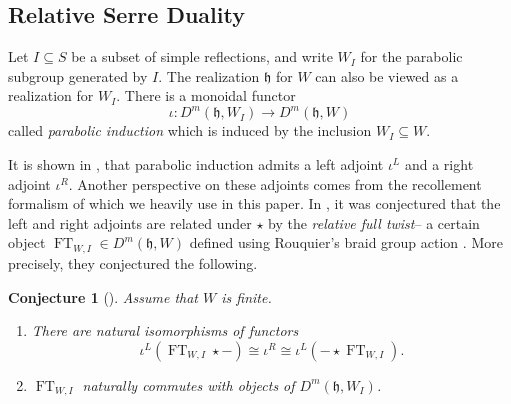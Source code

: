 \documentclass{amsart}
\newcommand{\BE}{D^m}
\newcommand{\fr}[1]{\mathfrak{#1}}
\newtheorem{conjecture}{Conjecture}[section]
\theoremstyle{definition}
\DeclareMathOperator{\FT}{FT}
\begin{document}
        \subsection{Relative Serre Duality}
        Let $I \subseteq S$ be a subset of simple reflections, and write $W_I$ for the parabolic subgroup generated by $I$. The realization $\fr{h}$ for $W$ can also be viewed as a realization for $W_I$. 
        There is a monoidal functor
        \[\iota : \BE (\fr{h}, W_I) \to \BE (\fr{h}, W)\]
        called \emph{parabolic induction} which is induced by the inclusion $W_I \subseteq W$. 

        It is shown in \cite[Corollary A.8]{GHMN}, that parabolic induction admits a left adjoint $\iota^L$ and a right adjoint $\iota^R$.
        Another perspective on these adjoints comes from the recollement formalism of \cite{ARV} which we heavily use in this paper.
        In \cite{GHMN}, it was conjectured that the left and right adjoints are related under $\star$ by the \emph{relative full twist}-- a certain object $\FT_{W, I} \in \BE (\fr{h}, W)$ defined using Rouquier's braid group action \cite{Rou}.
        More precisely, they conjectured the following.

        \begin{conjecture}[{\!\!\cite[Conjecture 1.8]{GHMN}}]\label{conj:rel_serre_duality_intro}
                Assume that $W$ is finite.
                \begin{enumerate}
                        \item There are natural isomorphisms of functors 
                \[
                        \iota^L (\FT_{W, I} \star -) \cong  \iota^R \cong \iota^L (- \star \FT_{W, I}).
                \]
                        \item $\FT_{W,I}$ naturally commutes with objects of $\BE (\fr{h}, W_I)$.
                \end{enumerate}
        \end{conjecture}
\end{document}
